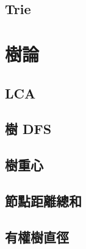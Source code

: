 \subsection{Trie} 


\section{樹論}
\subsection{LCA} 

\subsection{樹 DFS} 

\subsection{樹重心} 

\subsection{節點距離總和}

\subsection{有權樹直徑} 
